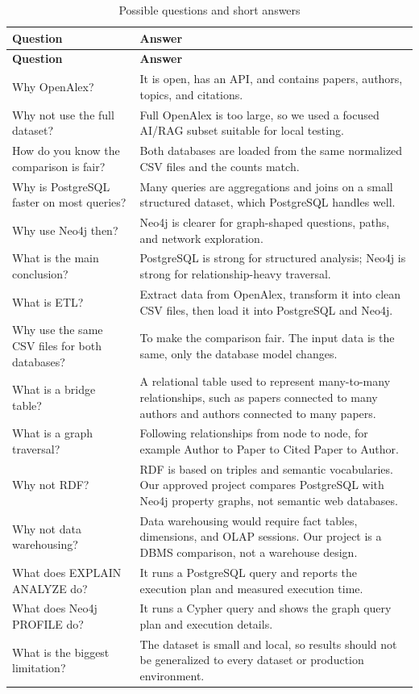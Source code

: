 \documentclass[11pt]{article}
\begin{document}
\small
\begin{longtable}{|p{}|p{}|}
\caption{Possible questions and short answers}\\
\hline
\textbf{Question} & \textbf{Answer} \\
\hline
\endfirsthead
\hline
\textbf{Question} & \textbf{Answer} \\
\hline
\endhead
Why OpenAlex? & It is open, has an API, and contains papers, authors, topics, and citations. \\
\hline
Why not use the full dataset? & Full OpenAlex is too large, so we used a focused AI/RAG subset suitable for local testing. \\
\hline
How do you know the comparison is fair? & Both databases are loaded from the same normalized CSV files and the counts match. \\
\hline
Why is PostgreSQL faster on most queries? & Many queries are aggregations and joins on a small structured dataset, which PostgreSQL handles well. \\
\hline
Why use Neo4j then? & Neo4j is clearer for graph-shaped questions, paths, and network exploration. \\
\hline
What is the main conclusion? & PostgreSQL is strong for structured analysis; Neo4j is strong for relationship-heavy traversal. \\
\hline
What is ETL? & Extract data from OpenAlex, transform it into clean CSV files, then load it into PostgreSQL and Neo4j. \\
\hline
Why use the same CSV files for both databases? & To make the comparison fair. The input data is the same, only the database model changes. \\
\hline
What is a bridge table? & A relational table used to represent many-to-many relationships, such as papers connected to many authors and authors connected to many papers. \\
\hline
What is a graph traversal? & Following relationships from node to node, for example Author to Paper to Cited Paper to Author. \\
\hline
Why not RDF? & RDF is based on triples and semantic vocabularies. Our approved project compares PostgreSQL with Neo4j property graphs, not semantic web databases. \\
\hline
Why not data warehousing? & Data warehousing would require fact tables, dimensions, and OLAP sessions. Our project is a DBMS comparison, not a warehouse design. \\
\hline
What does EXPLAIN ANALYZE do? & It runs a PostgreSQL query and reports the execution plan and measured execution time. \\
\hline
What does Neo4j PROFILE do? & It runs a Cypher query and shows the graph query plan and execution details. \\
\hline
What is the biggest limitation? & The dataset is small and local, so results should not be generalized to every dataset or production environment. \\
\hline
\end{longtable}
\normalsize
\end{document}
